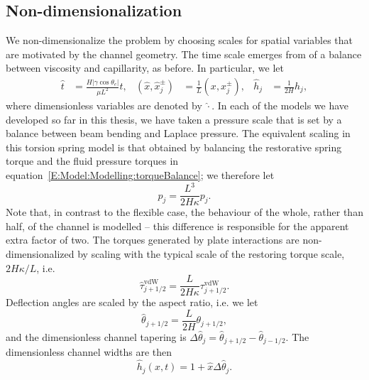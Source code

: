 \subsection{Non-dimensionalization}\label{S:Model:NonDim}
We non-dimensionalize the problem by choosing scales for spatial variables that are motivated by the channel geometry. The time scale emerges from of a balance between viscosity and capillarity, as before. In particular, we let
\begin{align}\label{E:Model:NonDim:Scales1}
\hat{t} &= \frac{H |\gamma \cos \theta_e|} {\mu L^2}t, &  (\hat{x},\hat{x}_j^{\pm})&= \frac{1}{L}(x,x_{j}^{\pm}), & \hat{h}_j &= \frac{1}{2H}h_j,
\end{align}
where dimensionless variables are denoted by $\hat{\cdot}$. In each of the models we have developed so far in this thesis, we have taken a  pressure scale that is set by a balance between beam bending and Laplace pressure. The equivalent scaling in this torsion spring model is that obtained by balancing the restorative spring torque and the fluid pressure torques in equation~\eqref{E:Model:Modelling:torqueBalance}; we therefore let
\begin{equation}\label{E:Model:NonDim:PressureScaling}
\hat{p}_j = \frac{L^3}{ 2H \kappa}p_j.
\end{equation}
Note that, in contrast to the flexible case, the behaviour of the whole, rather than half, of the channel is modelled -- this difference is responsible for the apparent extra factor of two. The torques generated by plate interactions are non-dimensionalized by scaling with the typical scale of the restoring torque scale, $2H\kappa/L$, i.e.
\begin{equation}\label{E:Model:NonDim:BeamInteractionTorqueScaling}
\hat{\tau}_{j+1/2}^{\text{vdW}} = \frac{L}{2H \kappa} \tau_{j+1/2}^{\text{vdW}}.
\end{equation}
Deflection angles are scaled by the aspect ratio, i.e. we let
\begin{equation}\label{E:Model:NonDim:AngleScaling}
\hat{\theta}_{j+1/2} = \frac{L}{2H}{\theta}_{j+1/2},
\end{equation}
and the dimensionless channel tapering is $\Delta \hat{\theta}_{j} = \hat{\theta}_{j+1/2} - \hat{\theta}_{j-1/2}$. The dimensionless channel widths are then
\begin{equation}\label{E:Model:NonDim:DimensionlessChannelWidth}
\hat{h}_j(x,t) = 1 + \hat{x}\Delta \hat{\theta}_{j}.
\end{equation}


